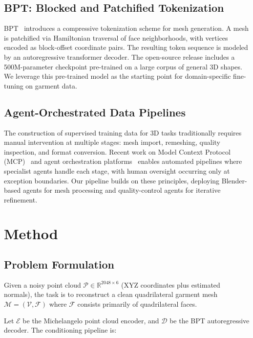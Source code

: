 \documentclass[conference]{IEEEtran}
\begin{document}
\subsection{BPT: Blocked and Patchified Tokenization}

BPT~\cite{weng2024bpt} introduces a compressive tokenization scheme for mesh generation.
A mesh is patchified via Hamiltonian traversal of face neighborhoods, with vertices encoded as block-offset coordinate pairs.
The resulting token sequence is modeled by an autoregressive transformer decoder.
The open-source release includes a 500M-parameter checkpoint pre-trained on a large corpus of general 3D shapes.
We leverage this pre-trained model as the starting point for domain-specific fine-tuning on garment data.

\subsection{Agent-Orchestrated Data Pipelines}

The construction of supervised training data for 3D tasks traditionally requires manual intervention at multiple stages: mesh import, remeshing, quality inspection, and format conversion.
Recent work on Model Context Protocol (MCP)~\cite{mcp2024} and agent orchestration platforms~\cite{yang2026a2a} enables automated pipelines where specialist agents handle each stage, with human oversight occurring only at exception boundaries.
Our pipeline builds on these principles, deploying Blender-based agents for mesh processing and quality-control agents for iterative refinement.

\section{Method}

\subsection{Problem Formulation}

Given a noisy point cloud $\mathcal{P} \in \mathbb{R}^{2048 \times 6}$ (XYZ coordinates plus estimated normals), the task is to reconstruct a clean quadrilateral garment mesh $\mathcal{M} = (\mathcal{V}, \mathcal{F})$ where $\mathcal{F}$ consists primarily of quadrilateral faces.

Let $\mathcal{E}$ be the Michelangelo point cloud encoder, and $\mathcal{D}$ be the BPT autoregressive decoder.
The conditioning pipeline is:
\end{document}
